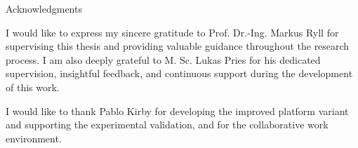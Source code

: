 \thispagestyle{empty}

\vspace*{20mm}

\begin{center}
    { Acknowledgments}
\end{center}

\vspace{10mm}

I would like to express my sincere gratitude to Prof. Dr.-Ing. Markus Ryll for supervising this thesis and providing valuable guidance throughout the research process. I am also deeply grateful to M. Sc. Lukas Pries for his dedicated supervision, insightful feedback, and continuous support during the development of this work.

I would like to thank Pablo Kirby for developing the improved platform variant and supporting the experimental validation, and for the collaborative work environment.

\cleardoublepage{}
